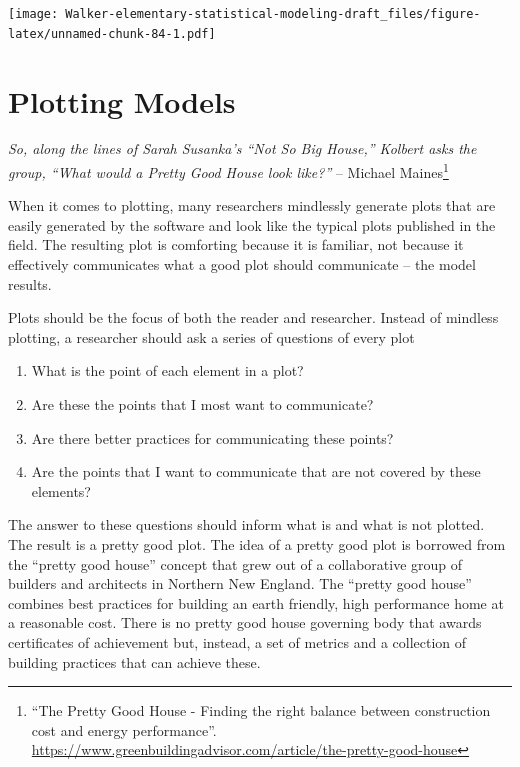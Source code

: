 \documentclass[]{book}
\providecommand{\tightlist}{%
  \setlength{\itemsep}{0pt}\setlength{\parskip}{0pt}}
\let\rmarkdownfootnote\footnote%
\def\footnote{\protect\rmarkdownfootnote}
\begin{document}
\texttt{[image: Walker-elementary-statistical-modeling-draft\_files/figure-latex/unnamed-chunk-84-1.pdf]}

\hypertarget{plotting-models}{%
\chapter{Plotting Models}\label{plotting-models}}

\emph{So, along the lines of Sarah Susanka's ``Not So Big House,'' Kolbert asks the group, ``What would a Pretty Good House look like?''} -- Michael Maines\footnote{``The Pretty Good House - Finding the right balance between construction cost and energy performance''. \url{https://www.greenbuildingadvisor.com/article/the-pretty-good-house}}

When it comes to plotting, many researchers mindlessly generate plots that are easily generated by the software and look like the typical plots published in the field. The resulting plot is comforting because it is familiar, not because it effectively communicates what a good plot should communicate -- the model results.

Plots should be the focus of both the reader and researcher. Instead of mindless plotting, a researcher should ask a series of questions of every plot

\begin{enumerate}
\def\labelenumi{\arabic{enumi}.}
\tightlist
\item
  What is the point of each element in a plot?
\item
  Are these the points that I most want to communicate?
\item
  Are there better practices for communicating these points?
\item
  Are the points that I want to communicate that are not covered by these elements?
\end{enumerate}

The answer to these questions should inform what is and what is not plotted. The result is a pretty good plot. The idea of a pretty good plot is borrowed from the ``pretty good house'' concept that grew out of a collaborative group of builders and architects in Northern New England. The ``pretty good house'' combines best practices for building an earth friendly, high performance home at a reasonable cost. There is no pretty good house governing body that awards certificates of achievement but, instead, a set of metrics and a collection of building practices that can achieve these.
\end{document}
